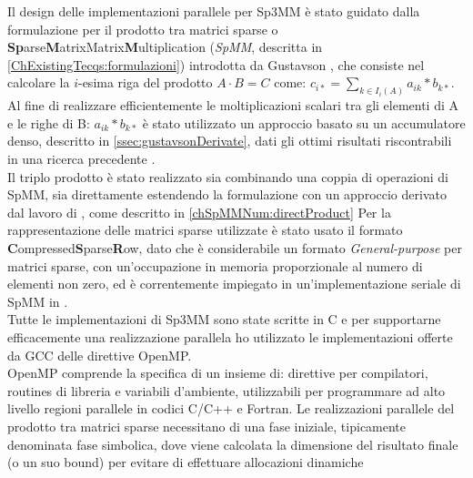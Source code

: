 Il design delle implementazioni parallele per Sp3MM è stato guidato dalla formulazione \rowbyrow per il prodotto tra matrici sparse o\\
{\bf{Sp}}arse{\bf{M}}atrixMatrix{\bf{M}}ultiplication (\emph{SpMM}, descritta in \ref{ChExistingTecqs:formulazioni}) introdotta da Gustavson \cite{gustavson},
che consiste nel calcolare la $i$-esima riga del prodotto $A\cdot B = C$ come:	$c_{i*} = \sum\limits_{k \in I_i(A)}  a_{ik} \ast  b_{k*}$.\\
Al fine di realizzare efficientemente le moltiplicazioni scalari tra gli elementi di A e le righe di B: $a_{ik} \ast  b_{k*}$
è stato utilizzato un approccio basato su un accumulatore denso, descritto in \ref{ssec:gustavsonDerivate}, 
dati gli ottimi risultati riscontrabili in una ricerca precedente \cite{intelSpMMDenseAccumulator}.\\
Il triplo prodotto è stato realizzato sia combinando una coppia di operazioni di SpMM, sia direttamente
estendendo la formulazione \rowbyrow con un approccio derivato dal lavoro di \cite{Sp3MM4AMG}, come descritto in \ref{chSpMMNum:directProduct}
\voidLine	
Per la rappresentazione delle matrici sparse utilizzate è stato usato il formato\\{\bf{C}}ompressed{\bf{S}}parse{\bf{R}}ow,
dato che 
è considerabile un formato \emph{General-purpose} per matrici sparse, con un'occupazione in memoria proporzionale al numero di elementi non zero,
ed è correntemente impiegato in un'implementazione seriale di SpMM in .\\
Tutte le implementazioni di Sp3MM sono state scritte in C
e per supportarne efficacemente una realizzazione parallela ho utilizzato le implementazioni offerte da GCC delle direttive OpenMP.\\
OpenMP comprende la specifica di un insieme di: 
direttive per compilatori, routines di libreria e variabili d'ambiente, utilizzabili per programmare ad alto livello regioni parallele in codici C/C++ e Fortran.
\voidLine
Le realizzazioni parallele del prodotto tra matrici sparse necessitano di una fase iniziale, tipicamente denominata fase simbolica,
dove viene calcolata la dimensione del risultato finale (o un suo bound) per evitare di effettuare allocazioni dinamiche 
